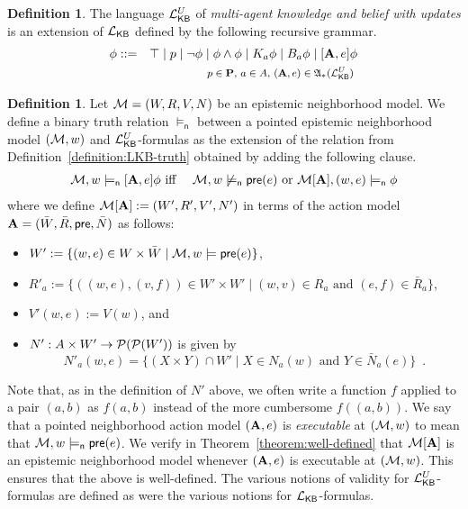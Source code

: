 \documentclass[12pt]{article}
\theoremstyle{definition}
\newtheorem{definition}[theorem]{Definition}
\newcommand{\pow}{{\cal P}}    %
\newcommand{\M}{{\cal M}}      %
\newcommand{\Prop}{{\bf P}}    %
\newcommand{\Lang}{{\cal L}}   %
\newcommand{\pre}{\mathsf{pre}}
\newcommand{\A}{{\bf A}}
\newcommand{\Actm}{\mathfrak{A}}   %
\newcommand{\KB}{{\mathsf{KB}}}                        %
\newcommand{\modelsn}{\models_{\mathsf{n}}}                  %
\begin{document}
\begin{definition}
  The language $\Lang_\KB^U$ of \emph{multi-agent knowledge and belief
    with updates} is an extension of $\Lang_\KB$ defined by the
  following recursive grammar.
  \begin{eqnarray*}
    \phi & ::= & 
    \top \mid p \mid \neg\phi \mid \phi\land\phi \mid
    K_a\phi \mid B_a\phi \mid [\A,e]\phi
    \\
    &&
    \text{\footnotesize 
      $p\in\Prop$,
      $a\in A$,
      $(\A,e)\in\Actm_*(\Lang_\KB^U)$
    }
  \end{eqnarray*}
\end{definition}

\begin{definition}
  \label{definition:LKBU-truth}
  Let $\M = (W,R,V,N)$ be an epistemic neighborhood model.  We define a
  binary truth relation $\modelsn$ between a pointed epistemic
  neighborhood model $(\M,w)$ and $\Lang_\KB^U$-formulas as the
  extension of the relation from Definition~\ref{definition:LKB-truth}
  obtained by adding the following clause.
  \begin{eqnarray*} 
    \M, w \modelsn [\A,e]\phi & \text{ iff } &
    \M, w \not\modelsn \pre(e) \text{ or }
    \M[\A], (w,e) \modelsn\phi
  \end{eqnarray*}
  where we define $\M[\A]:=(W',R',V',N')$ in terms of the action model
  $\A=(\bar{W},\bar{R},\pre,\bar{N})$ as follows:
  \begin{itemize}
  \item $W' := \{(w,e)\in W\times\bar{W}\mid \M , w \models \pre(e) \}$,

  \item $R'_a:=
    \{ ((w,e),(v,f))\in W'\times W' \mid
    (w,v)\in R_a \text{ and } (e,f)\in\bar{R}_a \}$,

  \item $V'(w,e) := V(w)$, and

  \item $N': A\times W' \to \pow(\pow(W'))$ is given by 
    \[
    N'_a(w,e) = \{ (X \times Y) \cap W' \mid X \in N_a (w) \text{ and } Y \in
    \bar{N}_a(e) \} \enspace.
    \]
  \end{itemize}
  Note that, as in the definition of $N'$ above, we often write a
  function $f$ applied to a pair $(a,b)$ as $f(a,b)$ instead of the
  more cumbersome $f((a,b))$.  We say that a pointed neighborhood
  action model $(\A,e)$ is \emph{executable} at $(\M,w)$ to mean that
  $\M,w\modelsn\pre(e)$.  We verify in
  Theorem~\ref{theorem:well-defined} that $\M[\A]$ is an epistemic
  neighborhood model whenever $(\A,e)$ is executable at $(\M,w)$.
  This ensures that the above is well-defined.  The various notions of
  validity for $\Lang_\KB^U$-formulas are defined as were the various
  notions for $\Lang_\KB$-formulas.
\end{definition}
\end{document}
